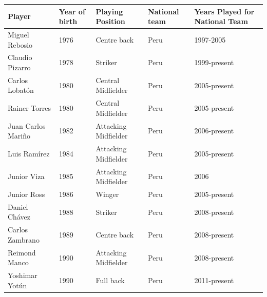 \documentclass{article}
\begin{document}
\begin{tabular}{lllll}
\toprule
Player & Year of birth & Playing Position & National team & Years Played for National Team \\
\midrule
Miguel Rebosio & 1976 & Centre back & Peru & 1997-2005 \\
Claudio Pizarro & 1978 & Striker & Peru & 1999-present \\
Carlos Lobatón & 1980 & Central Midfielder & Peru & 2005-present \\
Rainer Torres & 1980 & Central Midfielder & Peru & 2005-present \\
Juan Carlos Mariño & 1982 & Attacking Midfielder & Peru & 2006-present \\
Luis Ramírez & 1984 & Attacking Midfielder & Peru & 2005-present \\
Junior Viza & 1985 & Attacking Midfielder & Peru & 2006 \\
Junior Ross & 1986 & Winger & Peru & 2005-present \\
Daniel Chávez & 1988 & Striker & Peru & 2008-present \\
Carlos Zambrano & 1989 & Centre back & Peru & 2008-present \\
Reimond Manco & 1990 & Attacking Midfielder & Peru & 2008-present \\
Yoshimar Yotún & 1990 & Full back & Peru & 2011-present \\
\bottomrule
\end{tabular}
\end{document}
